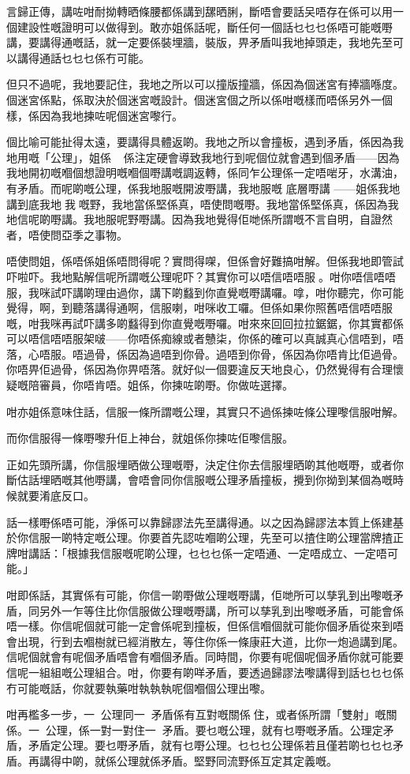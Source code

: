 言歸正傳，講咗咁耐拗轉晒條腰都係講到𦧲晒脷，斷唔會要話㕦唔存在係可以用一個建設性嘅證明可以做得到。敢亦姐係話呢，斷任何一個話乜乜乜係唔可能嘅嘢講，要講得通嘅話，就一定要係裝埋牆，裝版，畀矛盾叫我地掉頭走，我地先至可以講得通話乜乜乜係冇可能。

但只不過呢，我地要記住，我地之所以可以撞版撞牆，係因為個迷宮有捧牆喺度。個迷宮係點，係取決於個迷宮嘅設計。個迷宮個之所以係咁嘅樣而唔係另外一個樣，係因為我地揀咗呢個迷宮嚟行。

個比喻可能扯得太遠，要講得具體返啲。我地之所以會撞板，遇到矛盾，係因為我地用嘅「公理」，姐係，係注定硬會導致我地行到呢個位就會遇到個矛盾——因為我地開初嘅嗰個想證明嘅嗰個嘢講嘅調返轉，係同乍公理係一定唔啱牙，水溝油，有矛盾。而呢啲嘅公理，係我地服嘅開波嘢講，我地服嘅 底層嘢講 ——姐係我地講到底我地󰇞我嘅野，我地當係堅係真，唔使問嘅嘢。我地當係堅係真，係因為我地信呢啲嘢講。我地服呢野嘢講。因為我地覺得佢哋係所謂嘅不言自明，自證然者，唔使問亞季之事物。

唔使問姐，係唔係姐係唔問得呢？實問得㗎，但係會好難搞咁解。但係我地即管試吓啦吓。我地點解信呢所謂嘅公理呢吓？其實你可以唔信唔唔服。咁你唔信唔唔服，我咪試吓講啲理由過你，講下啲蠽到你直覺嘅嘢講囉。嗱，咁你聽完，你可能覺得，啊，到聽落講得通啊，信服喇，咁咪收工囉。但係如果你照舊唔信唔唔服嘅，咁我咪再試吓講多啲蠽得到你直覺嘅嘢囉。咁來來回回拉拉鋸鋸，你其實都係可以唔信唔唔服架啵——你唔係痴線或者戇柒，你係的確可以真誠真心信唔到，唔落，心唔服。唔過骨，係因為過唔到你骨。過唔到你骨，係因為你唔肯比佢過骨。你唔畀佢過骨，係因為你畀唔落。就好似一個要違反天地良心，仍然覺得有合理懷疑嘅陪審員，你唔肯唔。姐係，你揀咗啲嘢。你做咗選擇。

咁亦姐係意味住話，信服一條所謂嘅公理，其實只不過係揀咗條公理嚟信服咁解。

而你信服得一條嘢嚟升佢上神台，就姐係你揀咗佢嚟信服。

正如先頭所講，你信服埋晒做公理嘅嘢，決定住你去信服埋晒啲其他嘅嘢，或者你斷估話埋晒嘅其他嘢講，會唔會同你信服嘅公理矛盾撞板，攪到你拗到某個為嘅時候就要淆底反口。

話一樣嘢係唔可能，淨係可以靠歸謬法先至講得通。以之因為歸謬法本質上係建基於你信服一啲特定嘅公理。你要首先認咗嗰啲公理，先至可以揸住啲公理當牌揸正牌咁講話：「根據我信服嘅呢啲公理，乜乜乜係一定唔通、一定唔成立、一定唔可能。」

咁即係話，其實係有可能，你信一啲嘢做公理嘅嘢講，佢哋所可以孳乳到出嚟嘅矛盾，同另外一乍等住比你信服做公理嘅嘢講，所可以孳乳到出嚟嘅矛盾，可能會係唔一樣。你信呢個就可能一定會係呢到撞板，但係信嗰個就可能你個矛盾從來到唔會出現，行到去嗰樹就已經消散左，等住你係一條康莊大道，比你一炮過講到尾。信呢個就會有呢個矛盾唔會有嗰個矛盾。同時間，你要有呢個呢個矛盾你就可能要信呢一組組嘅公理組合。咁，你要有啲咩矛盾，要透過歸謬法嚟講得到話乜乜乜係冇可能嘅話，你就要執藥咁執執執呢個嗰個公理出嚟。

咁再檻多一步，一󱝚公理同一󱝚矛盾係有互對嘅關係住，或者係所謂「雙射」嘅關係。一󱝚公理，係一對一對住一󱝚矛盾。要乜嘅公理，就有乜嘢嘅矛盾。公理定矛盾，矛盾定公理。要乜嘢矛盾，就有乜嘢公理。乜乜乜公理係若且僅若啲乜乜乜矛盾。再講得中啲，就係公理就係矛盾。堅野同流野係互定其定義嘅。
